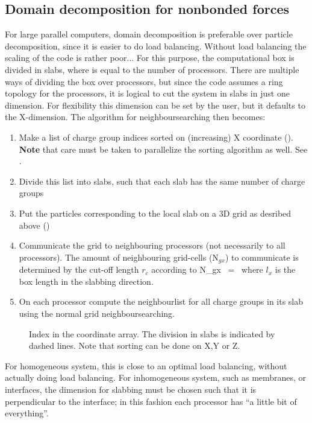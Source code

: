 \subsection{Domain decomposition for nonbonded forces}
For large parallel computers, domain decomposition is preferable over particle
decomposition, since it is easier to do load balancing. Without load balancing
the scaling of the code is rather poor...
For this purpose, the computational box is divided in {\nproc} slabs, where {\nproc}
is equal to the number of processors. There are multiple ways of dividing the box
over processors, but since the {\gromacs} code assumes
a ring topology for the processors, it is logical to cut the system in slabs in
just one dimension. For flexibility this dimension can be set by the user,
but it defaults to the X-dimension.
The algorithm for neighboursearching then becomes:
\begin{enumerate}
\item	Make a list of charge group indices sorted on (increasing) X coordinate
	().
	{\bf Note} that care must be taken to parallelize the sorting algorithm
	as well. See .
\item	Divide this list into slabs, such that each slab has the same number of
	charge groups
\item	Put the particles corresponding to the local slab on a 3D grid as 
	desribed above ()
\item	Communicate the grid to neighbouring processors (not necessarily to all
	processors). The amount of neighbouring grid-cells (N$_{gx}$) to 
	communicate is determined by the cut-off length $r_c$ according to
	\beq
	N_{gx}	~=~	   
	\eeq
	where $l_x$ is the box length in the slabbing direction. 
\item	On each processor compute the neighbourlist for all charge groups in
	its slab using the normal grid neighboursearching.
\end{enumerate}

\begin{figure}[h]
\centerline{}
\caption{Index in the coordinate array. The division in slabs is indicated by dashed lines. Note that sorting can be done on X,Y or Z.}
\label{fig:parsort}
\end{figure}

For homogeneous system, this is close to an optimal load balancing, without 
actually doing load balancing. For inhomogeneous system, such as membranes, or 
interfaces, the dimension for slabbing must be chosen such that it is perpendicular
to the interface; in this fashion each processor has ``a little bit of everything''.

